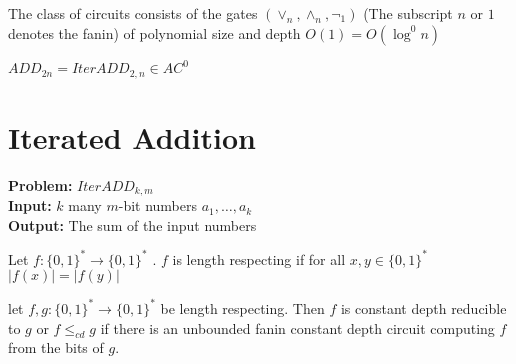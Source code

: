 \begin{definition}[$AC^0$]
	The class of circuits consists of the gates $(\vee_n,\wedge_n,\neg_1)$ (The subscript $n$ or $1$ denotes the fanin) of polynomial size and depth $O(1)=O(\log^0 n)$ 
\end{definition}

\begin{theorem}
	$ADD_{2n}=IterADD_{2,n}\in AC^0$
\end{theorem}

\section{Iterated Addition}
\textbf{Problem:} $IterADD_{k,m}$\\
\textbf{Input:} $k$ many $m$-bit numbers $a_1,\dots,a_k$\\
\textbf{Output:} The sum of the input numbers\\

\begin{definition}
Let $f:\{0,1\}^* \to \{0,1\}^*$ . $f$ is length respecting if for all $x,y\in \{0,1\}^*$ $|f(x)|=|f(y)|$
\end{definition}

\begin{definition}
	let  $f,g:\{0,1\}^*\to \{0,1\}^*$  be length respecting. Then $f$ is constant depth reducible to $g$ or $f\leq_{cd} g$  if there is an unbounded fanin constant depth circuit computing $f$ from the bits of $g$.
\end{definition}


